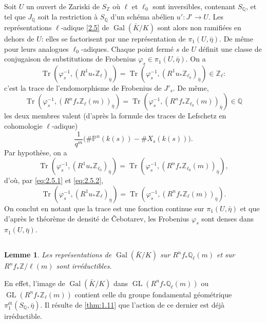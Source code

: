 \documentclass[10pt,leqno]{amsart}
\theoremstyle{plain}
\newtheorem{lemma}[theorem]{Lemme}
\theoremstyle{definition}
\theoremstyle{remark}
\DeclareMathOperator{\GL}{GL}
\DeclareMathOperator{\Gal}{Gal}
\DeclareMathOperator{\Tr}{Tr}
\newcommand{\ZZ}{\mathbb{Z}}
\newcommand{\QQ}{\mathbb{Q}}
\newcommand{\PP}{\mathbb{P}}
\begin{document}
Soit $U$ un ouvert de Zariski de $S_\ZZ$ o\`u $\ell$ et $\ell_0$ sont inversibles, contenant $S_\QQ$, et tel que $J_\QQ$ soit la restriction \`a $S_\QQ$ d'un sch\'ema ab\'elien $u'\colon J'\to U$. Les repr\'esentations $\ell$-adique \ref{2.5} de $\Gal(\bar{K}/K)$ sont alors non ramifi\'ees en dehors de $U$: elles se factorisent par une repr\'esentation de $\pi_1(U,\bar{\eta})$. De m\^eme pour leurs analogues $\ell_0$-adiques. Chaque point ferm\'e $s$ de $U$ d\'efinit une classe de conjugaison de substitutions de Frobenius $\varphi_s\in\pi_1(U,\bar{\eta})$. On a
\begin{equation}\label{eq:2.5.1}
\Tr(\varphi_s^{-1},(R^1u_*\ZZ_\ell)_{\bar{\eta}})=\Tr(\varphi_s^{-1},(R^1u_*\ZZ_{\ell_0})_{\bar{\eta}})\in\ZZ_\ell:
\end{equation}
c'est la trace de l'endomorphisme de Frobenius de $J'_s$. De m\^eme,
\begin{equation}\label{eq:2.5.2}
\Tr(\varphi_s^{-1},(R^nf_*\ZZ_\ell(m))_{\bar{\eta}})=\Tr(\varphi_s^{-1},(R^nf_*\ZZ_{\ell_0}(m))_{\bar{\eta}})\in\QQ
\end{equation}
les deux membres valent (d'apr\`es la formule des traces de Lefschetz en cohomologie $\ell$-adique)
\[
\frac{1}{q^m}\bigl(\#\PP^n(k(s))-\#X_s(k(s))\bigr).
\]
Par hypoth\`ese, on a
\[
\Tr(\varphi_s^{-1},(R^1u_*\ZZ_{\ell_0})_{\bar{\eta}})=\Tr(\varphi_s^{-1},(R^nf_*\ZZ_{\ell_0}(m))_{\bar{\eta}}),
\]
d'o\`u, par \eqref{eq:2.5.1} et \eqref{eq:2.5.2},
\[
\Tr(\varphi_s^{-1},(R^1u_*\ZZ_\ell)_{\bar{\eta}})=\Tr(\varphi_s^{-1},(R^nf_*\ZZ_\ell(m))_{\bar{\eta}}).
\]
On conclut en notant que la trace est une fonction continue sur $\pi_1(U,\bar{\eta})$ et que d'apr\`es le th\'eor\`eme de densit\'e de \v{C}ebotarev, les Frobenius $\varphi_s$ sont denses dans $\pi_1(U,\bar{\eta})$.

\subsection{}\label{2.6}

\begin{lemma}\label{lem:2.6}
Les repr\'esentations de $\Gal(\bar{K}/K)$ sur $R^nf_*\QQ_\ell(m)$ et sur $R^nf_*\ZZ/\ell(m)$ sont irr\'eductibles.
\end{lemma}

En effet, l'image de $\Gal(\bar{K}/K)$ dans $\GL(R^nf_*\QQ_\ell(m))$ ou $\GL(R^nf_*\ZZ_\ell(m))$ contient celle du groupe fondamental g\'eom\'etrique $\pi_1^{\text{\'et}}(S_\QQ,\bar{\eta})$. Il r\'esulte de \ref{thm:1.11} que l'action de ce dernier est d\'ej\`a irr\'eductible.
\end{document}
